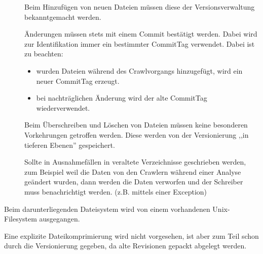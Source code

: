 \begin{description}
		\begin{description}
			\item []
				Beim Hinzufügen von neuen Dateien müssen diese der Versionsverwaltung bekanntgemacht werden.
			\item []
				Änderungen müssen stets mit einem Commit bestätigt werden.
				Dabei wird zur Identifikation immer ein bestimmter CommitTag verwendet.
				Dabei ist zu beachten:
				\begin{itemize}
					\item wurden Dateien während des Crawlvorgangs hinzugefügt,
						wird ein neuer CommitTag erzeugt.
					\item bei nachträglichen Änderung wird der alte CommitTag wiederverwendet.
				\end{itemize}
			\item []
				Beim Überschreiben und Löschen von Dateien müssen keine besonderen Vorkehrungen
				getroffen werden.
				Diese werden von der Versionierung ,,in tieferen Ebenen'' gespeichert.
			\item []
				Sollte in Ausnahmefällen in veraltete Verzeichnisse geschrieben werden, 
				zum Beispiel weil die Daten von den Crawlern während einer Analyse geändert wurden,
				dann werden die Daten verworfen und der Schreiber muss benachrichtigt werden.
				(z.B. mittels einer Exception)
		\end{description}
	\item [\req{Dateisystem}{fs}]
		Beim darunterliegenden Dateisystem wird von einem vorhandenen Unix-Filesystem ausgegangen.
	\item [\req{Komprimierung}{compress}]
		Eine explizite Dateikomprimierung wird nicht vorgesehen, 
		ist aber zum Teil schon durch die Versionierung gegeben, 
		da alte Revisionen gepackt abgelegt werden.
\end{description}


